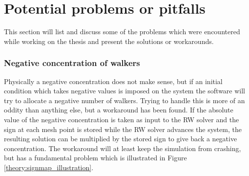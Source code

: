 \section{Potential problems or pitfalls}\label{problems_and_pitfalls}
 
 This section will list and discuss some of the problems which were encountered while working on the thesis and present the solutions or workarounds.

% 


 
\subsubsection{Negative concentration of walkers}
Physically a negative concentration does not make sense, but if an initial condition which takes negative values is imposed on the system the software will try to allocate a negative number of walkers. 
Trying to handle this is more of an oddity than anything else, but a workaround has been found. 
If the absolute value of the negative concentration is taken as input to the RW solver and the sign at each mesh point is stored while the RW solver advances the system, the resulting solution can be multiplied by the stored sign to give back a negative concentration. 
The workaround will at least keep the simulation from crashing, but has a fundamental problem which is illustrated in Figure \ref{theory:signmap_illustration}.
  
